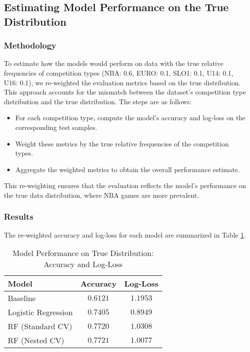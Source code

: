 \documentclass[fleqn,moreauthors,10pt]{ds_report}
\begin{document}
\subsection*{Estimating Model Performance on the True Distribution}

\subsubsection*{Methodology}
To estimate how the models would perform on data with the true relative frequencies of competition types (NBA: 0.6, EURO: 0.1, SLO1: 0.1, U14: 0.1, U16: 0.1), we re-weighted the evaluation metrics based on the true distribution. This approach accounts for the mismatch between the dataset's competition type distribution and the true distribution. The steps are as follows:
\begin{itemize}
    \item For each competition type, compute the model's accuracy and log-loss on the corresponding test samples.
    \item Weight these metrics by the true relative frequencies of the competition types.
    \item Aggregate the weighted metrics to obtain the overall performance estimate.
\end{itemize}

This re-weighting ensures that the evaluation reflects the model's performance on the true data distribution, where NBA games are more prevalent.

\subsubsection*{Results}

The re-weighted accuracy and log-loss for each model are summarized in Table \ref{tab:true_distribution_performance}.

\begin{table}[h]
\centering
\caption{Model Performance on True Distribution: Accuracy and Log-Loss}
\begin{tabular}{|l|c|c|}
\hline
\textbf{Model} & \textbf{Accuracy} & \textbf{Log-Loss} \\ \hline
Baseline & \( 0.6121 \) & \( 1.1953 \) \\ \hline
Logistic Regression & \( 0.7405 \) & \( \mathbf{0.8949} \) \\ \hline
RF (Standard CV) & \( 0.7720 \) & \( 1.0308 \) \\ \hline
RF (Nested CV) & \( \mathbf{0.7721} \) & \( 1.0077 \) \\ \hline
\end{tabular}
\label{tab:true_distribution_performance}
\end{table}
\end{document}
